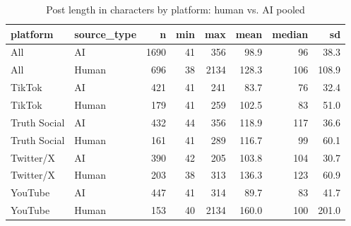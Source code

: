 \begin{table}

\caption{Post length in characters by platform: human vs. AI pooled}
\centering
\begin{tabular}[t]{llrrrrrr}
\toprule
platform & source\_type & n & min & max & mean & median & sd\\
\midrule
All & AI & 1690 & 41 & 356 & 98.9 & 96 & 38.3\\
All & Human & 696 & 38 & 2134 & 128.3 & 106 & 108.9\\
TikTok & AI & 421 & 41 & 241 & 83.7 & 76 & 32.4\\
TikTok & Human & 179 & 41 & 259 & 102.5 & 83 & 51.0\\
Truth Social & AI & 432 & 44 & 356 & 118.9 & 117 & 36.6\\
\addlinespace
Truth Social & Human & 161 & 41 & 289 & 116.7 & 99 & 60.1\\
Twitter/X & AI & 390 & 42 & 205 & 103.8 & 104 & 30.7\\
Twitter/X & Human & 203 & 38 & 313 & 136.3 & 123 & 60.9\\
YouTube & AI & 447 & 41 & 314 & 89.7 & 83 & 41.7\\
YouTube & Human & 153 & 40 & 2134 & 160.0 & 100 & 201.0\\
\bottomrule
\end{tabular}
\end{table}
